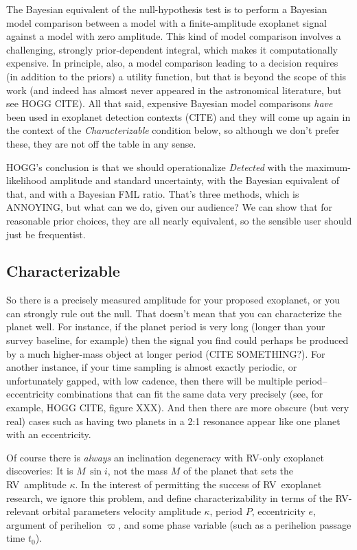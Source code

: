\documentclass[modern]{aastex63}
\newcommand{\acronym}[1]{{\small{#1}}}
\newcommand{\rv}{\acronym{RV}}
\begin{document}
The Bayesian equivalent of the null-hypothesis test is to perform a
Bayesian model comparison between a model with a finite-amplitude
exoplanet signal against a model with zero amplitude.
This kind of model comparison involves a challenging, strongly
prior-dependent integral, which makes it computationally expensive.
In principle, also, a model comparison leading to a decision requires
(in addition to the priors) a utility function, but that is beyond the
scope of this work (and indeed has almost never appeared in the
astronomical literature, but see HOGG CITE).
All that said, expensive Bayesian model comparisons \emph{have} been
used in exoplanet detection contexts (CITE) and they will come up
again in the context of the \textsl{Characterizable} condition below,
so although we don't prefer these, they are not off the table in any
sense.

HOGG's conclusion is that we should operationalize \textsl{Detected}
with the maximum-likelihood amplitude and standard uncertainty, with
the Bayesian equivalent of that, and with a Bayesian FML ratio. That's
three methods, which is ANNOYING, but what can we do, given our
audience?  We can show that for reasonable prior choices, they are all
nearly equivalent, so the sensible user should just be frequentist.

\subsection{Characterizable}

So there is a precisely measured amplitude for your proposed exoplanet,
or you can strongly rule out the null.
That doesn't mean that you can characterize the planet well.
For instance, if the planet period is very long (longer than your
survey baseline, for example) then the signal you find could perhaps
be produced by a much higher-mass object at longer period (CITE SOMETHING?).
For another instance, if your time sampling is almost exactly
periodic, or unfortunately gapped, with low cadence, then there will
be multiple period--eccentricity combinations that can fit the same
data very precisely (see, for example, HOGG CITE, figure XXX).
And then there are more obscure (but very real) cases such as having two
planets in a 2:1 resonance appear like one planet with an eccentricity.

Of course there is \emph{always} an inclination degeneracy with \rv-only
exoplanet discoveries: It is $M\,\sin i$, not the mass $M$ of the planet
that sets the \rv\ amplitude $\kappa$.
In the interest of permitting the success of \rv\ exoplanet research,
we ignore this problem, and define characterizability in terms of
the \rv-relevant orbital parameters velocity amplitude $\kappa$,
period $P$, eccentricity $e$, argument of perihelion $\varpi$, and
some phase variable (such as a perihelion passage time $t_0$).
\end{document}
